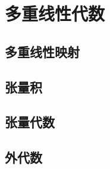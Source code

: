 \documentclass[12pt, a4paper, oneside, UTF8]{ctexbook}
\begin{document}
% 
\else
\fi
\chapter{多重线性代数}
	\section{多重线性映射}
	\section{张量积}
	\section{张量代数}
	\section{外代数}
\ifx\allfiles\undefined
\end{document}
